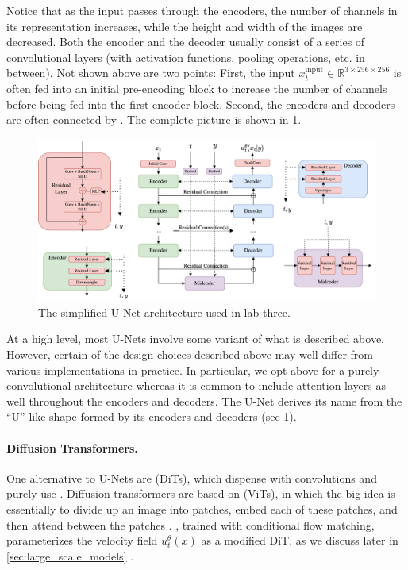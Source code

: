 Notice that as the input passes through the encoders, the number of channels in its representation increases, while the height and width of the images are decreased. Both the encoder and the decoder usually consist of a series of convolutional layers (with activation functions, pooling operations, etc. in between). Not shown above are two points: First, the input $x^{\text{input}}_t\in \mathbb{R}^{3 \times 256 \times 256}$ is often fed into an initial pre-encoding block to increase the number of channels before being fed into the first encoder block. Second, the encoders and decoders are often connected by . The complete picture is shown in \cref{fig:unet}.
\begin{figure}
    \centering
    \includegraphics[width=\textwidth]{figures/unet.png}
    \caption{The simplified U-Net architecture used in lab three.}
    \label{fig:unet}
\end{figure}
At a high level, most U-Nets involve some variant of what is described above. However, certain of the design choices described above may well differ from various implementations in practice. In particular, we opt above for a purely-convolutional architecture whereas it is common to include attention layers as well throughout the encoders and decoders. The U-Net derives its name from the ``U''-like shape formed by its encoders and decoders (see \cref{fig:unet}).

\paragraph{Diffusion Transformers.} One alternative to U-Nets are  (DiTs), which dispense with convolutions and purely use  \cite{attention, dit}. Diffusion transformers are based on  (ViTs), in which the big idea is essentially to divide up an image into patches, embed each of these patches, and then attend between the patches \cite{vit}. , trained with conditional flow matching, parameterizes the velocity field $u_t^{\theta}(x)$ as a modified DiT, as we discuss later in \cref{sec:large_scale_models} \cite{sd3}.

